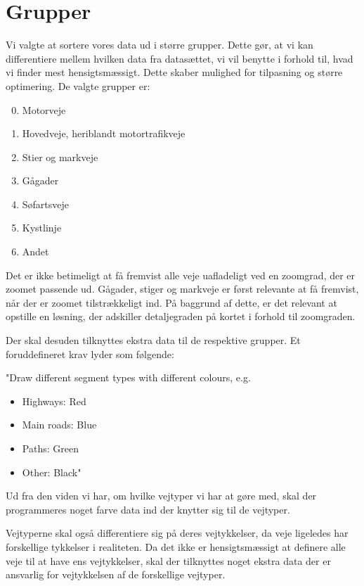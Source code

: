 \section{Grupper}
Vi valgte at sortere vores data ud i større grupper. Dette gør, at vi kan differentiere mellem hvilken data fra datasættet, vi vil benytte i forhold til, hvad vi finder mest hensigtsmæssigt. Dette skaber mulighed for tilpasning og større optimering. De valgte grupper er:
\begin{enumerate}
\setcounter{enumi}{-1}
	\item Motorveje
	\item Hovedveje, heriblandt motortrafikveje
	\item Stier og markveje
	\item Gågader
	\item Søfartsveje
	\item Kystlinje
	\item Andet
\end{enumerate}

Det er ikke betimeligt at få fremvist alle veje uafladeligt ved en zoomgrad, der er zoomet passende ud. Gågader, stiger og markveje er først relevante at få fremvist, når der er zoomet tilstrækkeligt ind. På baggrund af dette, er det relevant at opstille en løsning, der adskiller detaljegraden på kortet i forhold til zoomgraden.

Der skal desuden tilknyttes ekstra data til de respektive grupper. Et foruddefineret krav lyder som følgende: 

"Draw different segment types with different colours, e.g.

\begin{itemize}
	\item Highways: {\color{red} Red}
	\item Main roads: {\color{blue} Blue}
	\item Paths: {\color{green} Green}
	\item Other: Black"
\end{itemize}

Ud fra den viden vi har, om hvilke vejtyper vi har at gøre med, skal der programmeres noget farve data ind der knytter sig til de vejtyper. 

Vejtyperne skal også differentiere sig på deres vejtykkelser, da veje ligeledes har forskellige tykkelser i realiteten. Da det ikke er hensigtsmæssigt at definere alle veje til at have ens vejtykkelser, skal der tilknyttes noget ekstra data der er ansvarlig for vejtykkelsen af de forskellige vejtyper.  

